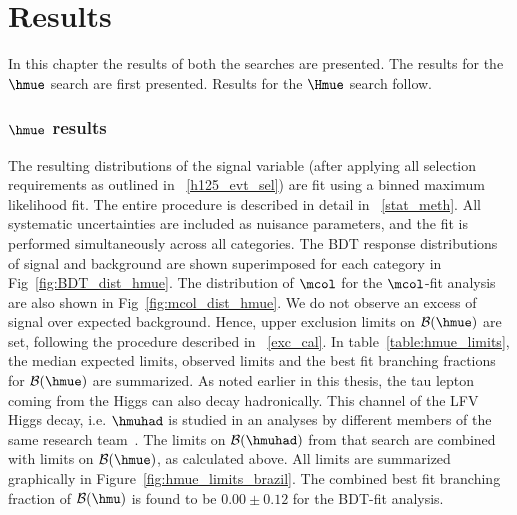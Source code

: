
%
%

\chapter{Results}
\label{results}
In this chapter the results of both the searches are presented. The results for the $\hmue$ search are first presented. Results for the $\Hmue$ search follow.

\subsection{$\hmue$ results}
The resulting distributions of the signal variable (after applying all selection requirements as outlined in ~\ref{h125_evt_sel}) are fit using a binned maximum likelihood fit. The entire procedure is described in detail in ~\ref{stat_meth}. All systematic uncertainties are included as nuisance parameters, and the fit is performed simultaneously across all categories. The BDT response distributions of signal and background are shown superimposed for each category in Fig~\ref{fig:BDT_dist_hmue}. The distribution of $\mcol$ for the $\mcol$-fit analysis are also shown in Fig~\ref{fig:mcol_dist_hmue}. We do not observe an excess of signal over expected background. Hence, upper exclusion limits on $\mathcal{B}(\hmue)$ are set, following the procedure described in ~\ref{exc_cal}. In table~\ref{table:hmue_limits}, the median expected limits, observed limits and the best fit branching fractions for $\mathcal{B}(\hmue)$ are summarized. As noted earlier in this thesis, the tau lepton coming from the Higgs can also decay hadronically. This channel of the LFV Higgs decay, i.e. $\hmuhad$ is studied in an analyses by different members of the same research team~\cite{HIG-17-001}. The limits on $\mathcal{B}(\hmuhad)$ from that search are combined with limits on $\mathcal{B}(\hmue)$, as calculated above. All limits are summarized graphically in Figure~\ref{fig:hmue_limits_brazil}. The combined best fit branching fraction of  $\mathcal{B}(\hmu)$ is found to be $0.00 \pm 0.12$ for the BDT-fit analysis.


